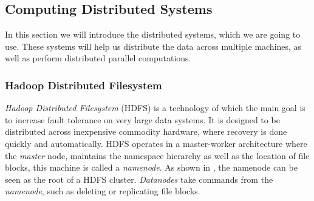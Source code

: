 \subsection{Computing Distributed Systems}\label{sec:distributed}
In this section we will introduce the distributed systems, which we are going to use. These systems will help us distribute the data across multiple machines, as well as perform distributed parallel computations. 

\subsubsection{Hadoop Distributed Filesystem}\label{sec:hadoopfilesystem}
\emph{Hadoop Distributed Filesystem} (HDFS) is a technology of which the main goal is to increase fault tolerance on very large data systems. It is designed to be distributed across inexpensive commodity hardware, where recovery is done quickly and automatically. HDFS operates in a master-worker architecture where the \emph{master} node, maintains the namespace hierarchy as well as the location of file blocks, this machine is called a \emph{namenode}. As shown in , the namenode can be seen as the root of a HDFS cluster. \emph{Datanodes} take commands from the \emph{namenode}, such as deleting or replicating file blocks.

